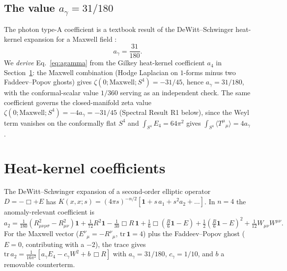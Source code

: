 \documentclass[11pt,a4paper]{article}
\theoremstyle{plain}
\theoremstyle{definition}
\theoremstyle{remark}
\newcommand{\ag}{a_\gamma}
\newcommand{\avg}[1]{\langle #1 \rangle}
\begin{document}
\subsection{The value $\ag = 31/180$}
The photon type-A coefficient is a textbook result of the DeWitt--Schwinger heat-kernel
expansion for a Maxwell field \cite{Birrell1982,ChristensenDuff1980,Duff1994}:
\begin{equation}
\label{eq:agamma}
\ag = \frac{31}{180}.
\end{equation}
We \emph{derive} Eq.~\eqref{eq:agamma} from the Gilkey heat-kernel coefficient $a_4$ in
Section~\ref{sec:heat}: the Maxwell combination (Hodge Laplacian on $1$-forms minus two
Faddeev--Popov ghosts) gives $\zeta(0;\mathrm{Maxwell};S^4) = -31/45$, hence $\ag = 31/180$, with
the conformal-scalar value $1/360$ serving as an independent check. The same coefficient governs
the closed-manifold zeta value
$\zeta(0;\text{Maxwell};S^4) = -4\ag = -31/45$ (Spectral Result R1 below), since the Weyl term
vanishes on the conformally flat $S^4$ and $\int_{S^4} E_4 = 64\pi^2$ gives
$\int_{S^4}\avg{T^\mu{}_\mu} = 4\ag$.

\section{Heat-kernel coefficients}
\label{sec:heat}
The DeWitt--Schwinger expansion of a second-order elliptic operator $D = -\Box + E$ has
$K(x,x;s) = (4\pi s)^{-n/2}[\mathbf{1} + s\,a_1 + s^2 a_2 + \dots]$. In $n=4$ the anomaly-relevant
coefficient is
\[
a_2 = \tfrac{1}{180}(R_{\mu\nu\rho\sigma}^2 - R_{\mu\nu}^2)\mathbf{1} + \tfrac{1}{72}R^2\mathbf{1}
 - \tfrac{1}{30}\Box R\,\mathbf{1} + \tfrac16\Box(\tfrac{R}{6}\mathbf{1} - E)
 + \tfrac12(\tfrac{R}{6}\mathbf{1} - E)^2 + \tfrac{1}{12}W_{\mu\nu}W^{\mu\nu}.
\]
For the Maxwell vector ($E^\nu{}_\mu = -R^\nu{}_\mu$, $\mathrm{tr}\,\mathbf{1} = 4$) plus the
Faddeev--Popov ghost ($E=0$, contributing with a $-2$), the trace gives
$\mathrm{tr}\,a_2 = \tfrac{1}{16\pi^2}[\ag E_4 - c_\gamma W^2 + b\,\Box R]$ with $\ag = 31/180$,
$c_\gamma = 1/10$, and $b$ a removable counterterm.
\end{document}
